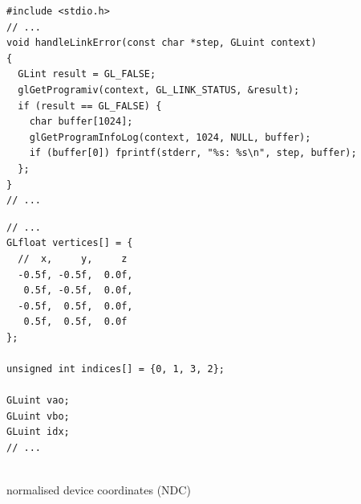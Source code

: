 \documentclass[calcdimensions,landscape,letterpaper]{powersem}
\newcommand{\thecurrentheading}{}
\newcommand{\heading}[1]{\renewcommand{\thecurrentheading}{#1}}
\begin{document}
\begin{slide}
    \heading{Minimal Pipeline: Link Errors}
    \begin{center}
        \begin{minipage}[c]{.95\textwidth}
            \begin{verbatim}
#include <stdio.h>
// ...
void handleLinkError(const char *step, GLuint context)
{
  GLint result = GL_FALSE;
  glGetProgramiv(context, GL_LINK_STATUS, &result);
  if (result == GL_FALSE) {
    char buffer[1024];
    glGetProgramInfoLog(context, 1024, NULL, buffer);
    if (buffer[0]) fprintf(stderr, "%s: %s\n", step, buffer);
  };
}
// ...
            \end{verbatim}
        \end{minipage}
    \end{center}
\end{slide}

\begin{slide}
    \heading{Vertex and Index Data}
    \begin{center}
        \begin{minipage}[b]{.55\textwidth}
            \begin{verbatim}
// ...
GLfloat vertices[] = {
  //  x,     y,     z
  -0.5f, -0.5f,  0.0f,
   0.5f, -0.5f,  0.0f,
  -0.5f,  0.5f,  0.0f,
   0.5f,  0.5f,  0.0f
};

unsigned int indices[] = {0, 1, 3, 2};

GLuint vao;
GLuint vbo;
GLuint idx;
// ...
            \end{verbatim}
        \end{minipage}
        \begin{minipage}[b]{.4\textwidth}
          \\
          normalised device coordinates (NDC)
        \end{minipage}
    \end{center}
\end{slide}
\end{document}

